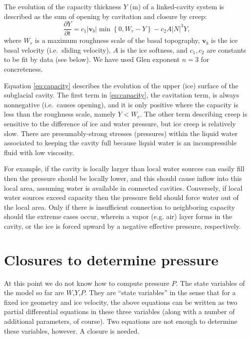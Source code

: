 \documentclass[12pt,final]{amsart}%
\newcommand\bv{\mathbf{v}}
\begin{document}
The evolution of the capacity thickness $Y$ (m) of a linked-cavity system is described as the sum of opening by cavitation and closure by creep:
\begin{equation}
\frac{\partial Y}{\partial t} = c_1 |\bv_b| \min\left\{0,W_r - Y\right\} - c_2 A |N|^3 Y, \label{eq:capacity}
\end{equation}
where $W_r$ is a maximum roughness scale of the basal topography, $\bv_b$ is the ice basal velocity (i.e.~sliding velocity), $A$ is the ice softness, and $c_1,c_2$ are constants to be fit by data (see below).  We have used Glen exponent $n=3$ for concreteness.

Equation \eqref{eq:capacity} describes the evolution of the upper (ice) surface of the subglacial cavity.  The first term in \eqref{eq:capacity}, the cavitation term, is always nonnegative (i.e.~causes opening), and it is only positive where the capacity is less than the roughness scale, namely $Y<W_r$.  The other term describing creep is sensitive to the difference of ice and water pressure, but ice creep is relatively slow.  There are presumably-strong stresses (pressures) within the liquid water associated to keeping the cavity full because liquid water is an incompressible fluid with low viscosity.

For example, if the cavity is locally larger than local water sources can easily fill then the pressure should be locally lower, and this should cause inflow into this local area, assuming water is available in connected cavities.  Conversely, if local water sources exceed capacity then the pressure field should force water out of the local area.  Only if there is insufficient connection to neighboring capacity should the extreme cases occur, wherein a vapor (e.g. air) layer forms in the cavity, or the ice is forced upward by a negative effective pressure, respectively.

\section{Closures to determine pressure}

At this point we do not know how to compute pressure $P$.  The state variables of the model so far are $W$,$Y$,$P$.  They are ``state variables'' in the sense that for a fixed ice geometry and ice velocity, the above equations can be written as two partial differential equations in these three variables (along with a number of additional parameters, of course).  Two equations are not enough to determine these variables, however.  A closure is needed.
\end{document}
